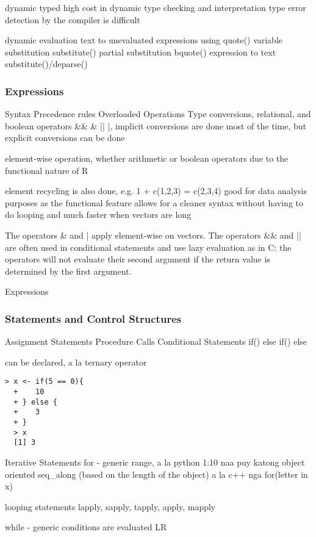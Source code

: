 \documentclass[12pt]{article}
\begin{document}
  dynamic typed
  high cost in dynamic type checking and interpretation
  type error detection by the compiler is difficult

  dynamic evaluation
  text to unevaluated expressions using quote()
  variable substitution substitute()
  partial substitution bquote()
  expression to text substitute()/deparse()

\subsubsection{Expressions}
Syntax
Precedence rules
Overloaded Operations
Type conversions, relational, and boolean operators
 \&\& \& || |, implicit conversions are done most of the time, but explicit conversions can be done

 element-wise operation, whether arithmetic or boolean operators due to the functional nature of R

 element recycling is also done, e.g. 1 + c(1,2,3) = c(2,3,4)
 good for data analysis purposes as the functional feature allows for a cleaner syntax without having to do looping and much faster when vectors are long

 The operators \& and | apply element-wise on vectors. The operators \&\& and || are often used in conditional statements and use lazy evaluation as in C: the operators will not evaluate their second argument if the return value is determined by the first argument.

Expressions

\subsubsection{Statements and Control Structures}
Assignment Statements
Procedure Calls
Conditional Statements
if(){}
else if(){}
else{}

can be declared, a la ternary operator

\begin{lstlisting}[frame=single]
  > x <- if(5 == 0){
  +    10
  + } else {
  +    3
  + }
  > x
  [1] 3
\end{lstlisting}

Iterative Statements
for - generic
range, a la python 1:10
naa puy katong object oriented seq_along (based on the length of the object)
a la c++ nga for(letter in x)

looping statements
lapply, sapply, tapply, apply, mapply



while - generic
conditions are evaluated LR
\end{document}
